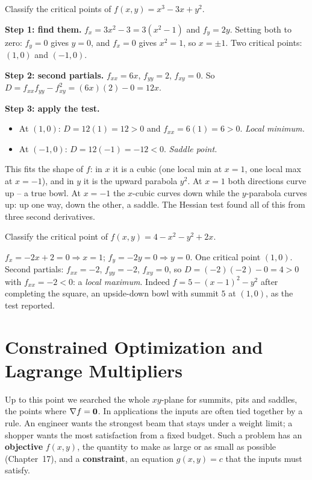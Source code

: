 \begin{example}
\label{ch33:ex-classify}
Classify the critical points of $f(x,y)=x^3 - 3x + y^2$.

\textbf{Step 1: find them.} $f_x = 3x^2 - 3 = 3(x^2-1)$ and $f_y = 2y$. Setting
both to zero: $f_y=0$ gives $y=0$, and $f_x=0$ gives $x^2=1$, so $x=\pm 1$. Two
critical points: $(1,0)$ and $(-1,0)$.

\textbf{Step 2: second partials.} $f_{xx}=6x$, $f_{yy}=2$, $f_{xy}=0$. So
$D = f_{xx}f_{yy}-f_{xy}^2 = (6x)(2) - 0 = 12x$.

\textbf{Step 3: apply the test.}
\begin{itemize}
\item At $(1,0)$: $D = 12(1) = 12 > 0$ and $f_{xx}=6(1)=6>0$. \emph{Local
minimum.}
\item At $(-1,0)$: $D = 12(-1) = -12 < 0$. \emph{Saddle point.}
\end{itemize}
This fits the shape of $f$: in $x$ it is a cubic (one local min at $x=1$, one local
max at $x=-1$), and in $y$ it is the upward parabola $y^2$. At $x=1$ both
directions curve up -- a true bowl. At $x=-1$ the $x$-cubic curves down while the
$y$-parabola curves up: up one way, down the other, a saddle. The Hessian test
found all of this from three second derivatives.
\end{example}

\begin{example}
\label{ch33:ex-max}
Classify the critical point of $f(x,y)=4 - x^2 - y^2 + 2x$.

$f_x = -2x + 2 = 0 \Rightarrow x = 1$; $f_y = -2y = 0 \Rightarrow y = 0$. One
critical point $(1,0)$. Second partials: $f_{xx}=-2$, $f_{yy}=-2$, $f_{xy}=0$, so
$D = (-2)(-2) - 0 = 4 > 0$ with $f_{xx}=-2<0$: a \emph{local maximum}. Indeed
$f = 5-(x-1)^2 - y^2$ after completing the square, an upside-down bowl with summit
$5$ at $(1,0)$, as the test reported.
\end{example}

\section{Constrained Optimization and Lagrange Multipliers}
\label{ch33:lagrange-multipliers}

Up to this point we searched the whole $xy$-plane for summits, pits and saddles,
the points where $\nabla f = \mathbf{0}$. In applications the inputs are often tied
together by a rule. An engineer wants the strongest beam that stays under a weight
limit; a shopper wants the most satisfaction from a fixed budget. Such a problem has
an \textbf{objective} $f(x,y)$, the quantity to make as large or as small as
possible (Chapter~17), and a \textbf{constraint}, an equation $g(x,y)=c$ that the
inputs must satisfy.

